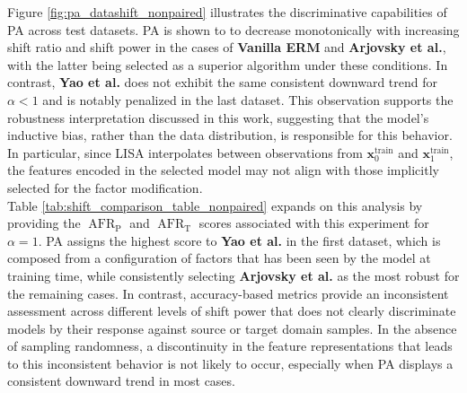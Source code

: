 Figure \ref{fig:pa_datashift_nonpaired} illustrates the discriminative capabilities of PA 
across test datasets. PA is shown to to decrease monotonically with increasing shift ratio and 
shift power in the cases of {\color{tab:blue} \textbf{Vanilla ERM}} and 
{\color{tab:orange} \textbf{Arjovsky et al.}}, with the latter being selected as a superior algorithm
under these conditions. In contrast, {\color{tab:green} \textbf{Yao et al.}}
does not exhibit the same consistent downward trend for $\alpha < 1$ and is notably penalized 
in the last dataset. This observation supports the robustness interpretation discussed in this work, suggesting that the model's 
inductive bias, rather than the data distribution, is responsible for this behavior. In particular, 
since LISA interpolates between observations from $\bm{x}_0^{\text{train}}$ and $\bm{x}_1^{\text{train}}$, 
the features encoded in the selected model may not align with those implicitly 
selected for the factor modification. \\

Table \ref{tab:shift_comparison_table_nonpaired} expands on this analysis
by providing the $\operatorname{AFR}_{\text{P}}$ and $\operatorname{AFR}_{\text{T}}$ scores
associated with this experiment for $\alpha=1$. PA assigns the highest score to {\color{tab:green} \textbf{Yao et al.}}
in the first dataset, which is composed from a configuration of factors that has been seen by the model
at training time, while consistently selecting {\color{tab:orange} \textbf{Arjovsky et al.}} as the 
most robust for the remaining cases. In contrast, accuracy-based metrics provide an 
inconsistent assessment across different levels of shift power that does not clearly discriminate
models by their response against source or target domain samples. In the absence of sampling randomness, 
a discontinuity in the feature representations that leads to this inconsistent behavior is not likely
to occur, especially when PA displays a consistent downward trend in most cases. \\

